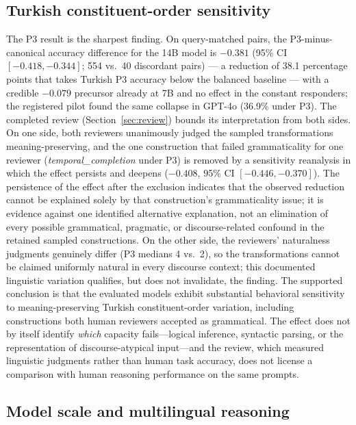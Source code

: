 \subsection{Turkish constituent-order sensitivity}

The P3 result is the sharpest finding. On query-matched pairs, the P3-minus-canonical accuracy difference
for the 14B model is $-0.381$ (95\% CI $[-0.418, -0.344]$; 554 vs.\ 40 discordant pairs) --- a reduction of
38.1 percentage points that takes Turkish P3 accuracy below the balanced baseline --- with a credible
$-0.079$ precursor already at 7B and no effect in the constant responders; the registered pilot found the
same collapse in GPT-4o (36.9\% under P3). The completed review (Section~\ref{sec:review}) bounds its interpretation from both
sides. On one side, both reviewers unanimously judged the sampled transformations meaning-preserving, and
the one construction that failed grammaticality for one reviewer (\emph{temporal\_completion} under P3) is
removed by a sensitivity reanalysis in which the effect persists and deepens ($-0.408$, 95\% CI
$[-0.446, -0.370]$). The persistence of the effect after the exclusion indicates that the observed
reduction cannot be explained solely by that construction's grammaticality issue; it is evidence against
one identified alternative explanation, not an elimination of every possible grammatical, pragmatic, or
discourse-related confound in the retained sampled constructions. On the other side, the reviewers' naturalness judgments genuinely differ (P3 medians 4
vs.\ 2), so the transformations cannot be claimed uniformly natural in every discourse context; this
documented linguistic variation qualifies, but does not invalidate, the finding. The supported conclusion
is that the evaluated models exhibit substantial behavioral sensitivity to meaning-preserving Turkish
constituent-order variation, including constructions both human reviewers accepted as grammatical. The
effect does not by itself identify \emph{which} capacity fails---logical inference, syntactic parsing, or
the representation of discourse-atypical input---and the review, which measured linguistic judgments
rather than human task accuracy, does not license a comparison with human reasoning performance on the
same prompts.

\subsection{Model scale and multilingual reasoning}

